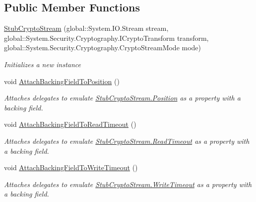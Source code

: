 \subsection*{Public Member Functions}
\begin{DoxyCompactItemize}
\item 
\hyperlink{class_system_1_1_security_1_1_cryptography_1_1_fakes_1_1_stub_crypto_stream_ae3341ad45cfc99c57c35af1ddaf4ef4e}{Stub\-Crypto\-Stream} (global\-::\-System.\-I\-O.\-Stream stream, global\-::\-System.\-Security.\-Cryptography.\-I\-Crypto\-Transform transform, global\-::\-System.\-Security.\-Cryptography.\-Crypto\-Stream\-Mode mode)
\begin{DoxyCompactList}\small\item\em Initializes a new instance\end{DoxyCompactList}\item 
void \hyperlink{class_system_1_1_security_1_1_cryptography_1_1_fakes_1_1_stub_crypto_stream_aab9f16c0893708351f8a6a4129f3be0c}{Attach\-Backing\-Field\-To\-Position} ()
\begin{DoxyCompactList}\small\item\em Attaches delegates to emulate \hyperlink{class_system_1_1_security_1_1_cryptography_1_1_fakes_1_1_stub_crypto_stream_aa00c3a516f311a869c5293478fb4a4f1}{Stub\-Crypto\-Stream.\-Position} as a property with a backing field.\end{DoxyCompactList}\item 
void \hyperlink{class_system_1_1_security_1_1_cryptography_1_1_fakes_1_1_stub_crypto_stream_ac0bcbe2f4547fbeee51bf347d1ac2972}{Attach\-Backing\-Field\-To\-Read\-Timeout} ()
\begin{DoxyCompactList}\small\item\em Attaches delegates to emulate \hyperlink{class_system_1_1_security_1_1_cryptography_1_1_fakes_1_1_stub_crypto_stream_a3e8e3c1220de4b8eb0174943a0fa3dc6}{Stub\-Crypto\-Stream.\-Read\-Timeout} as a property with a backing field.\end{DoxyCompactList}\item 
void \hyperlink{class_system_1_1_security_1_1_cryptography_1_1_fakes_1_1_stub_crypto_stream_a7e550f42e3f1b1d25f4f52fb76adfee5}{Attach\-Backing\-Field\-To\-Write\-Timeout} ()
\begin{DoxyCompactList}\small\item\em Attaches delegates to emulate \hyperlink{class_system_1_1_security_1_1_cryptography_1_1_fakes_1_1_stub_crypto_stream_ae3205a8e92a937dc4142067089f2f108}{Stub\-Crypto\-Stream.\-Write\-Timeout} as a property with a backing field.\end{DoxyCompactList}\item 

\end{DoxyCompactItemize}
